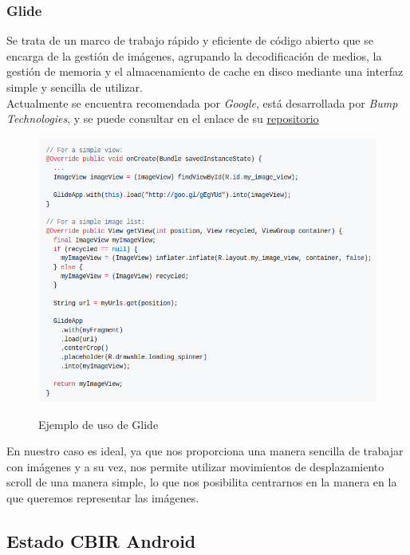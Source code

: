 \subsubsection{Glide}

Se trata de un marco de trabajo rápido y eficiente de código abierto que se encarga de la gestión de imágenes, agrupando la decodificación de medios, la gestión de memoria y el almacenamiento de cache en disco mediante una interfaz simple y sencilla de utilizar.\\

Actualmente se encuentra recomendada por \textit{Google}, está desarrollada por \textit{Bump Technologies}, y se puede consultar en el enlace de su \href{https://github.com/bumptech/glide}{repositorio}\\


\begin{figure}[H] %
\centering
\includegraphics[scale=0.5]{imagenes/glide.png}  %
\label{glide}
\caption{Ejemplo de uso de Glide}
\end{figure}

En nuestro caso es ideal, ya que nos proporciona una manera sencilla de trabajar con imágenes y a su vez, nos permite utilizar movimientos de desplazamiento scroll de una manera simple, lo que nos posibilita centrarnos en la manera en la que queremos representar las imágenes.

\subsection{Estado CBIR Android}


